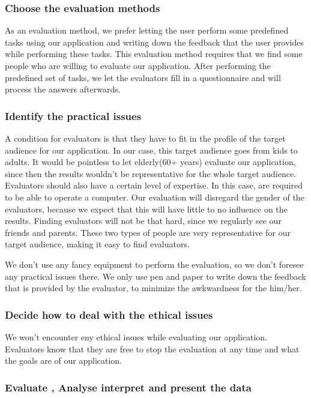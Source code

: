 \documentclass{article}
\begin{document}
\subsubsection{\textbf{C}hoose the evaluation methods}

As an evaluation method, we prefer letting the user perform some predefined tasks using our application and writing down the feedback that the user provides while performing these tasks. This evaluation method requires that we find some people who are willing to evaluate our application. After performing the predefined set of tasks, we let the evaluators fill in a questionnaire and will process the answers afterwards.

\subsubsection{\textbf{I}dentify the practical issues}

A condition for evaluators is that they have to fit in the profile of the target audience for our application. In our case, this target audience goes from kids to adults. It would be pointless to let elderly(60+ years) evaluate our application, since then the results wouldn't be representative for the whole target audience. Evaluators should also have a certain level of expertise. In this case, are required to be able to operate a computer. Our evaluation will disregard the gender of the evaluators, because we expect that this will have little to no influence on the results. Finding evaluators will not be that hard, since we regularly see our friends and parents. These two types of people are very representative for our target audience, making it easy to find evaluators.

We don't use any fancy equipment to perform the evaluation, so we don't foresee any practical issues there. We only use pen and paper to write down the feedback that is provided by the evaluator, to minimize the awkwardness for the him/her.

\subsubsection{\textbf{D}ecide how to deal with the ethical issues}

We won't encounter eny ethical issues while evaluating our application. Evaluators know that they are free to stop the evaluation at any time and what the goals are of our application.

\subsubsection{\textbf{E}valuate , Analyse interpret and present the data}
\end{document}
